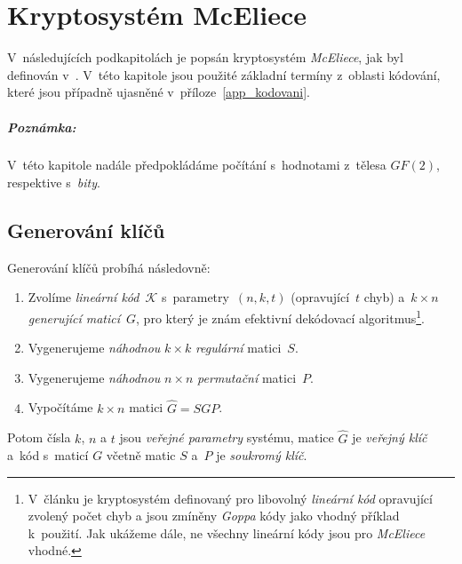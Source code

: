\documentclass[thesis=M,czech,hidelinks]{FITthesis}[2012/06/26]
\newcommand{\0}{{\textcolor[gray]{0.75}{0}}}
\begin{document}
\chapter{Kryptosystém McEliece}\label{kap_mceliece}


V~následujících podkapitolách je popsán kryptosystém \emph{McEliece}, jak byl
definován v~\cite{McEliece}. V~této kapitole jsou použité základní termíny
z~oblasti kódování, které jsou případně ujasněné v~příloze~\ref{app_kodovani}.


\paragraph{Poznámka:} V~této kapitole nadále předpokládáme počítání
s~hodnotami z~tělesa $GF(2)$, respektive s~\emph{bity}.



\section{Generování klíčů}\label{kap_generovani_klicu}

Generování klíčů probíhá následovně:

\begin{enumerate}
    \item Zvolíme \emph{lineární kód}~$\mathcal{K}$ s~parametry~$(n,k,t)$
        (opravující~$t$ chyb) a~$k \times n$ \emph{generující mati\-cí}~$G$,
        pro který je znám efektivní dekódovací algoritmus\footnote{
            V~článku je kryptosystém definovaný pro libovolný \emph{lineární
            kód} opravující zvolený počet chyb a jsou zmíněny \emph{Goppa} kódy
            jako vhodný příklad k~použití. Jak ukážeme dále, ne všechny lineární
            kódy jsou pro \emph{McEliece} vhodné.
        }.
    \item Vygenerujeme \emph{náhodnou} $k \times k$ \emph{regulární} matici~$S$.
    \item Vygenerujeme \emph{náhodnou} $n \times n$ \emph{permutační} matici~$P$.
    \item Vypočítáme $k \times n$ matici $\hat{G} = S G P$.
\end{enumerate}

Potom čísla $k$, $n$ a $t$ jsou \emph{veřejné parametry} systému, matice
$\hat{G}$ je \emph{veřejný klíč} a~kód s~maticí $G$ včetně matic $S$ a~$P$ je
\emph{soukromý klíč}.
\end{document}
